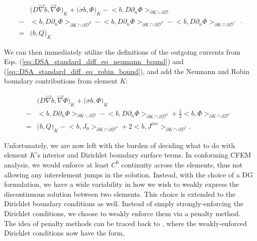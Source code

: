 \begin{equation}
\label{eq::SIP_diff_eq_weak_cellK_wbounds}
\begin{aligned}
&\Big(  D \vec{\nabla}  b , \vec{\nabla} \Phi  \Big)_{K}  + \Big(  \sigma   b ,  \Phi  \Big)_{K}   - \Big<  b, D \partial_n \Phi \Big>_{\partial K \backslash \partial \mathcal{D}}   \\
 - &\Big<  b, D \partial_n \Phi \Big>_{\partial	K \cap \partial \mathcal{D}^d} - \Big<  b, D \partial_n \Phi \Big>_{\partial	K \cap \partial \mathcal{D}^n}  - \Big<  b, D \partial_n \Phi \Big>_{\partial	K \cap \partial \mathcal{D}^r} \\
= &\Big(  b, Q  \Big)_{K} 
\end{aligned} .
\end{equation}

\noindent We can then immediately utilize the definitions of the outgoing currents from Eqs. (\ref{eq::DSA_standard_diff_eq_neumann_bound}) and (\ref{eq::DSA_standard_diff_eq_robin_bound}), and add the Neumann and Robin boundary contributions from element $K$:

\begin{equation}
\label{eq::SIP_diff_eq_weak_cellK_NR}
\begin{aligned}
&\Big(  D \vec{\nabla}  b , \vec{\nabla} \Phi  \Big)_{K}  + \Big(  \sigma   b ,  \Phi  \Big)_{K}  \\
- &\Big<  b, D \partial_n \Phi \Big>_{\partial K \backslash \partial \mathcal{D}} - \Big<  b, D \partial_n \Phi \Big>_{\partial	K \cap \partial \mathcal{D}^d}+ \frac{1}{2} \Big<  b, \Phi  \Big>_{\partial K \cap \partial \mathcal{D}^r} \\
= &\Big(  b, Q  \Big)_{K} - \Big<   b, J_{0}  \Big>_{\partial K \cap \partial \mathcal{D}^n} +  2 \Big<  b, J^{inc}  \Big>_{\partial	K \cap \partial \mathcal{D}^r}.
\end{aligned}
\end{equation}

Unfortunately, we are now left with the burden of deciding what to do with element $K$'s interior and Dirichlet boundary surface terms. In conforming CFEM analysis, we would enforce at least $C^0$ continuity across the elements, thus not allowing any interelement jumps in the solution. Instead, with the choice of a DG formulation, we have a wide variability in how we wish to weakly express the discontinuous solution between two elements. This choice is extended to the Dirichlet boundary conditions as well. Instead of simply strongly-enforcing the Dirichlet conditions, we choose to weakly enforce them via a penalty method. The idea of penalty methods can be traced back to \cite{lions2011problemes}, where the weakly-enforced Dirichlet conditions now have the form,

